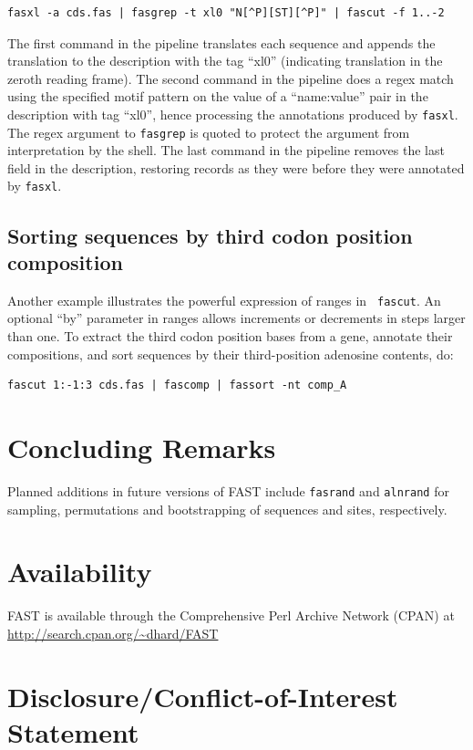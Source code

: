 \documentclass{frontiersSCNS} %
\begin{document}
\begin{verbatim}
fasxl -a cds.fas | fasgrep -t xl0 "N[^P][ST][^P]" | fascut -f 1..-2
\end{verbatim}
 
The first command in the pipeline translates each sequence and appends
the translation to the description with the tag ``xl0'' (indicating
translation in the zeroth reading frame). The second command in the
pipeline does a regex match using the specified motif pattern on the
value of a ``name:value'' pair in the description with tag ``xl0'',
hence processing the annotations produced by {\tt fasxl}. The regex
argument to {\tt fasgrep} is quoted to protect the argument from
interpretation by the shell. The last command in the pipeline removes
the last field in the description, restoring records as they were
before they were annotated by {\tt fasxl}.

\subsection{Sorting sequences by third codon position composition}

Another example illustrates the powerful expression of ranges in {\tt
  fascut}. An optional ``by'' parameter in ranges allows increments or
decrements in steps larger than one. To extract the third codon
position bases from a gene, annotate their compositions, and sort
sequences by their third-position adenosine contents, do:

\begin{verbatim}
fascut 1:-1:3 cds.fas | fascomp | fassort -nt comp_A
\end{verbatim}

\section{Concluding Remarks}

Planned additions in future versions of FAST include {\tt fasrand} and
{\tt alnrand} for sampling, permutations and bootstrapping of
sequences and sites, respectively.

\section*{Availability}

FAST is available through the Comprehensive Perl Archive Network
(CPAN) at \url{http://search.cpan.org/~dhard/FAST}

\section*{Disclosure/Conflict-of-Interest Statement}
\end{document}
